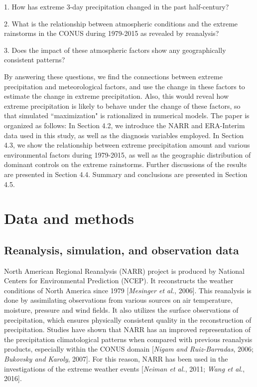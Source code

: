 1.  How has extreme 3-day precipitation changed in the past half-century?

2.  What is the relationship between atmospheric conditions and the extreme rainstorms in the CONUS during 1979-2015 as revealed by reanalysis?

3.  Does the impact of these atmospheric factors show any geographically consistent patterns?

By answering these questions, we find the connections between extreme precipitation and meteorological factors, and use the change in these factors to estimate the change in extreme precipitation. Also, this would reveal how extreme precipitation is likely to behave under the change of these factors, so that simulated ``maximization" is rationalized in numerical models. The paper is organized as follows: In Section 4.2, we introduce the NARR and ERA-Interim data used in this study, as well as the diagnosis variables employed. In Section 4.3, we show the relationship between extreme precipitation amount and various environmental factors during 1979-2015, as well as the geographic distribution of dominant controls on the extreme rainstorms. Further discussions of the results are presented in Section 4.4. Summary and conclusions are presented in Section 4.5.


\section{Data and methods}

\subsection{Reanalysis, simulation, and observation data}

North American Regional Reanalysis (NARR) project is produced by National Centers for Environmental Prediction (NCEP). It reconstructs the weather conditions of North America since 1979 [\textit{Mesinger et al.}, 2006]. This reanalysis is done by assimilating observations from various sources on air temperature, moisture, pressure and wind fields. It also utilizes the surface observations of precipitation, which ensures physically consistent quality in the reconstruction of precipitation. Studies have shown that NARR has an improved representation of the precipitation climatological patterns when compared with previous reanalysis products, especially within the CONUS domain [\textit{Nigam and Ruiz-Barradas}, 2006; \textit{Bukovsky and Karoly}, 2007]. For this reason, NARR has been used in the investigations of the extreme weather events [\textit{Neiman et al.}, 2011; \textit{Wang et al.}, 2016].

